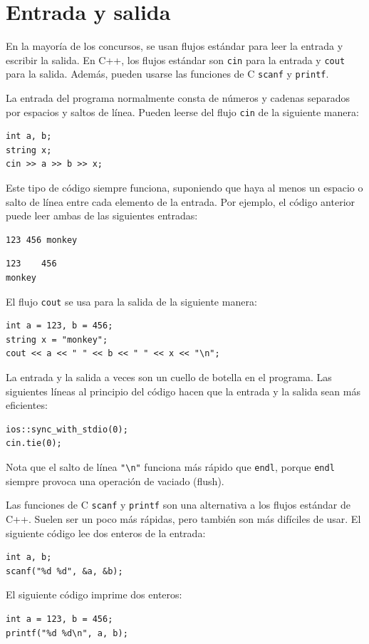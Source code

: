 \section{Entrada y salida}


En la mayoría de los concursos, se usan flujos estándar para
leer la entrada y escribir la salida.
En C++, los flujos estándar son
\texttt{cin} para la entrada y \texttt{cout} para la salida.
Además, pueden usarse las funciones de C
\texttt{scanf} y \texttt{printf}.

La entrada del programa normalmente consta de
números y cadenas separados por
espacios y saltos de línea.
Pueden leerse del flujo \texttt{cin}
de la siguiente manera:

\begin{lstlisting}
int a, b;
string x;
cin >> a >> b >> x;
\end{lstlisting}

Este tipo de código siempre funciona,
suponiendo que haya al menos un espacio
o salto de línea entre cada elemento de la entrada.
Por ejemplo, el código anterior puede leer
ambas de las siguientes entradas:
\begin{lstlisting}
123 456 monkey
\end{lstlisting}
\begin{lstlisting}
123    456
monkey
\end{lstlisting}
El flujo \texttt{cout} se usa para la salida
de la siguiente manera:
\begin{lstlisting}
int a = 123, b = 456;
string x = "monkey";
cout << a << " " << b << " " << x << "\n";
\end{lstlisting}

La entrada y la salida a veces son
un cuello de botella en el programa.
Las siguientes líneas al principio del código
hacen que la entrada y la salida sean más eficientes:

\begin{lstlisting}
ios::sync_with_stdio(0);
cin.tie(0);
\end{lstlisting}

Nota que el salto de línea \texttt{"\textbackslash n"}
funciona más rápido que \texttt{endl},
porque \texttt{endl} siempre provoca
una operación de vaciado (flush).

Las funciones de C \texttt{scanf}
y \texttt{printf} son una alternativa
a los flujos estándar de C++.
Suelen ser un poco más rápidas,
pero también son más difíciles de usar.
El siguiente código lee dos enteros de la entrada:
\begin{lstlisting}
int a, b;
scanf("%d %d", &a, &b);
\end{lstlisting}
El siguiente código imprime dos enteros:
\begin{lstlisting}
int a = 123, b = 456;
printf("%d %d\n", a, b);
\end{lstlisting}

